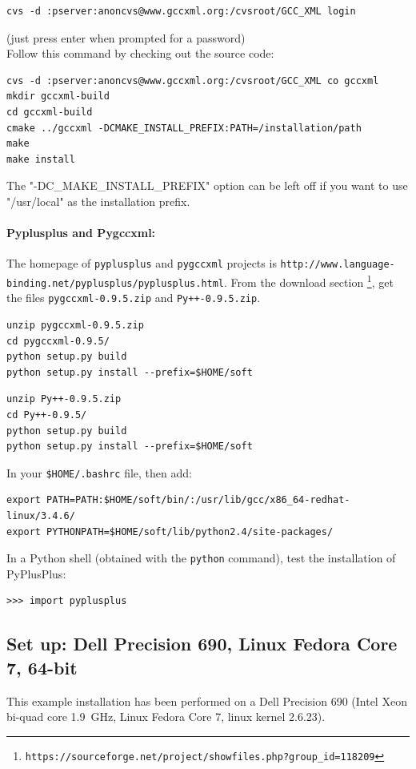 \documentclass[12pt,a4paper]{article}
\begin{document}
\begin{verbatim}
cvs -d :pserver:anoncvs@www.gccxml.org:/cvsroot/GCC_XML login
\end{verbatim}
(just press enter when prompted for a password)\\
Follow this command by checking out the source code:
\begin{verbatim}
cvs -d :pserver:anoncvs@www.gccxml.org:/cvsroot/GCC_XML co gccxml
mkdir gccxml-build
cd gccxml-build
cmake ../gccxml -DCMAKE_INSTALL_PREFIX:PATH=/installation/path
make
make install
\end{verbatim}
The "-DC\_MAKE\_INSTALL\_PREFIX" option can be left off if you want to use "/usr/local" as the installation prefix.

\paragraph{Pyplusplus and Pygccxml: }
The homepage of {\tt pyplusplus} and {\tt pygccxml} projects is 
{\tt http://www.language-binding.net/pyplusplus/pyplusplus.html}. From the
download section \footnote{\tt https://sourceforge.net/project/showfiles.php?group\_id=118209}, 
get the files {\tt pygccxml-0.9.5.zip} and {\tt Py++-0.9.5.zip}.

\begin{verbatim}
unzip pygccxml-0.9.5.zip
cd pygccxml-0.9.5/
python setup.py build
python setup.py install --prefix=$HOME/soft
\end{verbatim}

\begin{verbatim}
unzip Py++-0.9.5.zip 
cd Py++-0.9.5/
python setup.py build
python setup.py install --prefix=$HOME/soft
\end{verbatim}

In your {\tt \$HOME/.bashrc} file, then add:
\begin{verbatim}
export PATH=PATH:$HOME/soft/bin/:/usr/lib/gcc/x86_64-redhat-linux/3.4.6/
export PYTHONPATH=$HOME/soft/lib/python2.4/site-packages/
\end{verbatim}

In a Python shell (obtained with the {\tt python} command), test the installation
of PyPlusPlus:
\begin{verbatim}
>>> import pyplusplus
\end{verbatim}


\subsection{Set up: Dell Precision 690, Linux Fedora Core 7, 64-bit}
This example installation has been performed on a Dell Precision 690 (Intel
Xeon bi-quad core 1.9~GHz, Linux Fedora Core 7, linux kernel 2.6.23).
\end{document}
